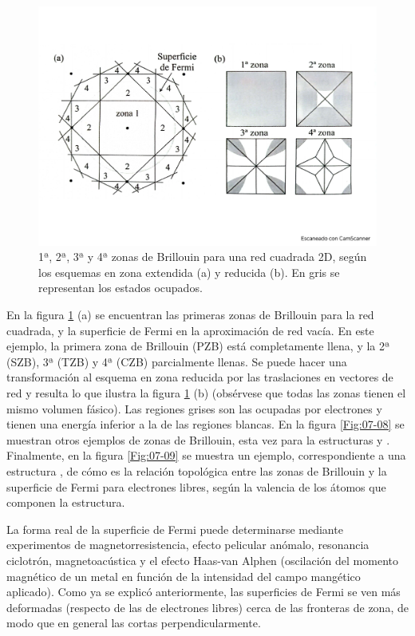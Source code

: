 \begin{figure}[h!] \centering
	\includegraphics[scale=0.35]{Cuerpo/Ch_07/Fotos libro 7.pdf}
	\caption{1ª, 2ª, 3ª y 4ª zonas de Brillouin para una red cuadrada 2D, según los esquemas en zona extendida (a) y reducida (b). En gris se representan los estados ocupados.}
	\label{Fig:07-07}
\end{figure}    

En la figura \ref{Fig:07-07} (a) se encuentran las primeras zonas de Brillouin para la red cuadrada, y la superficie de Fermi en la aproximación de red vacía. En este ejemplo, la primera zona de Brillouin (PZB) está completamente llena, y la 2ª (SZB), 3ª (TZB) y 4ª (CZB) parcialmente llenas. Se puede hacer una transformación al esquema en zona reducida por las traslaciones en vectores de red y resulta lo que ilustra la figura \ref{Fig:07-07} (b) (obsérvese que todas las zonas tienen el mismo volumen fásico). Las regiones grises son las ocupadas por electrones y tienen una energía inferior a la de las regiones blancas. En la figura \ref{Fig:07-08} se muestran otros ejemplos de zonas de Brillouin, esta vez para la estructuras \bcc y \fcc. Finalmente, en la figura \ref{Fig:07-09} se muestra un ejemplo, correspondiente a una estructura \fcc, de cómo es la relación topológica entre las zonas de Brillouin y la superficie de Fermi para electrones libres, según la valencia de los átomos que componen la estructura. 

La forma real de la superficie de Fermi puede determinarse mediante experimentos de magnetorresistencia, efecto pelicular anómalo, resonancia ciclotrón, magnetoacústica y el efecto Haas-van Alphen (oscilación del momento magnético de un metal en función de la intensidad del campo mangético aplicado). Como ya se explicó anteriormente, las superficies de Fermi se ven más deformadas (respecto de las de electrones libres) cerca de las fronteras de zona, de modo que en general las cortas perpendicularmente.

